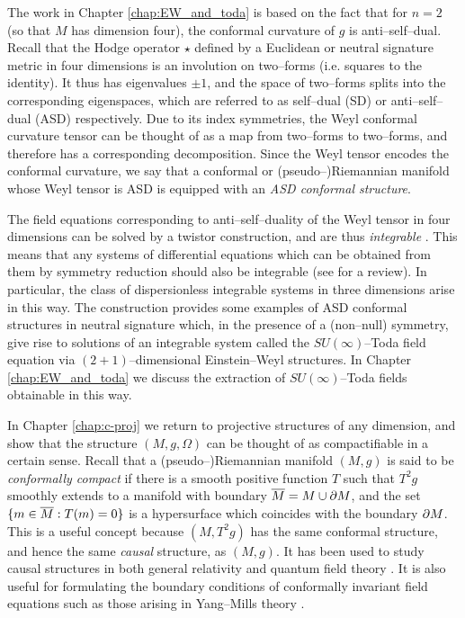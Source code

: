 The work in Chapter \ref{chap:EW_and_toda} is based on the fact that for $n=2$ (so that $M$ has dimension four), the conformal
curvature of $g$ is anti--self--dual. Recall that the Hodge operator
$\star$ defined by a Euclidean or neutral signature metric in four
dimensions is an involution on two--forms (i.e. squares to the identity).
It thus has eigenvalues $\pm1$, and the space of two--forms splits
into the corresponding eigenspaces, which are referred to as self--dual
(SD) or anti--self--dual (ASD) respectively. Due to its index symmetries,
the Weyl conformal curvature tensor can be thought of as a map from two--forms to two--forms,
and therefore has a corresponding decomposition. Since the Weyl tensor
encodes the conformal curvature, we say that a conformal or (pseudo--)Riemannian
manifold whose Weyl tensor is ASD is equipped with an \textit{ASD
conformal structure}.

The field equations corresponding to anti--self--duality of the Weyl
tensor in four dimensions can be solved by a twistor construction,
and are thus \textit{integrable} \cite{wardGauge}. This means that any systems of differential
equations which can be obtained from them by symmetry reduction should
also be integrable (see \cite{MW} for a review). In particular, the class of dispersionless
integrable systems in three dimensions arise in this way. The
construction \cite{DM} provides some examples of
ASD conformal structures in neutral signature which, in the presence
of a (non--null) symmetry, give rise to solutions of an integrable
system called the $SU(\infty)$--Toda field equation via $(2+1)$--dimensional
Einstein--Weyl structures. In Chapter \ref{chap:EW_and_toda} we discuss the extraction
of $SU(\infty)$--Toda fields obtainable in this way.

In Chapter \ref{chap:c-proj} we return to projective structures of any dimension, and show that the structure $(M,g,\Omega)$ can be thought of as compactifiable in a certain sense. Recall that a (pseudo--)Riemannian manifold $(M,g)$ is said to be \textit{conformally compact} if there is a smooth positive function $T$ such that $T^2g$ smoothly extends to a manifold with boundary $\overline{M}=M\cup\partial M$, and the set $\{m\in\overline{M}:T(m)=0\}$ is a hypersurface which coincides with the boundary $\partial M$.  This is a useful concept because $(M,T^2g)$ has the same conformal structure, and hence the same \textit{causal} structure, as $(M,g)$. It has been used to study causal structures in both general relativity \cite{penrose65} and quantum field theory \cite{witten}. It is also useful for formulating the boundary conditions of conformally invariant field equations such as those arising in Yang--Mills theory \cite{uhlen}.

